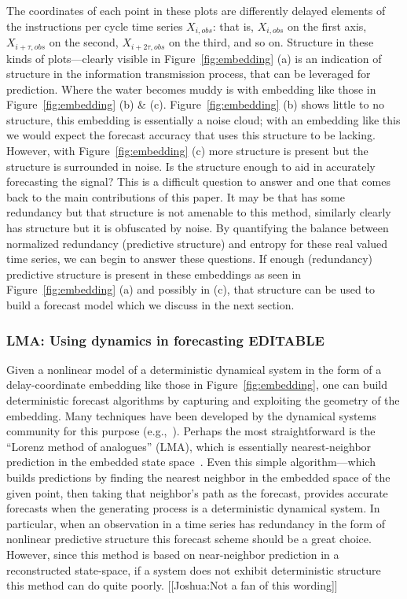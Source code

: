 The coordinates of each point in these plots are differently delayed
elements of the instructions per cycle time series
$X_{i,obs}$: that is, $X_{i,obs}$ on the first axis, $X_{i+\tau,obs}$ on the second,
$X_{i+2\tau,obs}$ on the third, and so on.
Structure in these kinds of plots---clearly visible in
Figure~\ref{fig:embedding} (a) is an indication of
structure in the information transmission process, that can be leveraged for prediction. Where the water becomes muddy is with embedding like those in Figure~\ref{fig:embedding} (b) \& (c). Figure~\ref{fig:embedding} (b) shows little to no structure, this embedding is essentially a noise cloud; with an embedding like this we would expect the forecast accuracy that uses this structure to be lacking. However, with Figure~\ref{fig:embedding} (c) more structure is present but the structure is surrounded in noise. Is the structure enough to aid in accurately forecasting the signal? This is a difficult question to answer and one that comes back to the main contributions of this paper. It may be that \gcc has some redundancy but that structure is not amenable to this method, similarly \svdfive clearly has structure but it is obfuscated by noise. By quantifying the balance between normalized redundancy (predictive structure) and entropy for these real valued time series, we can begin to answer these questions.  If enough (redundancy) predictive structure is present in these embeddings as seen in Figure~\ref{fig:embedding} (a) and possibly in (c), that structure can be used to build a forecast model which we discuss in the next section.
 \subsubsection{LMA: Using dynamics in forecasting {\color{blue} EDITABLE}}

Given a nonlinear model of a deterministic dynamical system in the
form of a delay-coordinate embedding like those in Figure~\ref{fig:embedding},
one can build deterministic forecast algorithms by capturing and
exploiting the geometry of the embedding.  Many techniques have been
developed by the dynamical systems community for this purpose
(e.g.,~\cite{weigend-book,casdagli-eubank92,Smith199250}).  Perhaps the most straightforward
is the ``Lorenz method of analogues'' (LMA), which is essentially
nearest-neighbor prediction in the embedded state
space~\cite{lorenz-analogues}.  Even this simple algorithm---which
builds predictions by finding the nearest neighbor in the embedded space of the given point, then taking that neighbor's path as the
forecast, provides accurate forecasts when the generating process is a deterministic dynamical system. In particular, when an observation in a time series has redundancy in the form of nonlinear predictive structure this forecast scheme should be a great choice. However, since this method is based on near-neighbor prediction in a reconstructed state-space, if a system does not exhibit deterministic structure this method can do quite poorly. {\color{red}[[Joshua:Not a fan of this wording]]}

